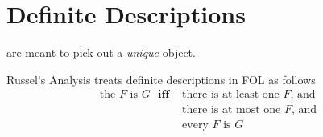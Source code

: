 \section{ Definite Descriptions}

\begin{definition}
     are meant to pick out a \emph{unique} object.
\end{definition}


\begin{definition}
    Russel's Analysis treats definite descriptions in FOL as follows \begin{align*}
            \text{the $F$ is $G$ } \textbf{iff }& \text{there is at least one $F$, and }\\
            &\text{there is at most one $F$, and} \\
            &\text{every $F$ is $G$}
    \end{align*}
\end{definition}
